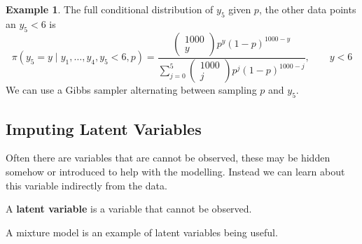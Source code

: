 \documentclass[
]{book}
\theoremstyle{definition}
\theoremstyle{definition}
\newtheorem{example}{Example}[chapter]
\theoremstyle{definition}
\theoremstyle{definition}
\theoremstyle{remark}
\begin{document}
\begin{example}
The full conditional distribution of \(y_5\) given \(p\), the other data points an \(y_5 < 6\) is
\[
  \pi(y_5 = y \mid y_1, \ldots, y_4, y_5 < 6, p) = \frac{\begin{pmatrix} 1000 \\ y \end{pmatrix} p^{y}(1-p)^{1000 - y}}{\sum_{j=0}^{5}\begin{pmatrix} 1000 \\ j \end{pmatrix} p^{j}(1-p)^{1000-j}}, \qquad y < 6
\]
We can use a Gibbs sampler alternating between sampling \(p\) and \(y_5\).
\end{example}

\hypertarget{imputing-latent-variables}{%
\subsection{Imputing Latent Variables}\label{imputing-latent-variables}}

Often there are variables that are cannot be observed, these may be hidden somehow or introduced to help with the modelling. Instead we can learn about this variable indirectly from the data.

A \textbf{latent variable} is a variable that cannot be observed.

A mixture model is an example of latent variables being useful.
\end{document}
